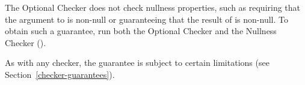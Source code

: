 The Optional Checker does not check nullness properties, such as requiring
that the argument to
is non-null or guaranteeing that the result of
is non-null.  To obtain such a guarantee, run both the Optional Checker and
the Nullness Checker ().

As with any checker, the guarantee is subject to certain limitations (see
Section~\ref{checker-guarantees}).


